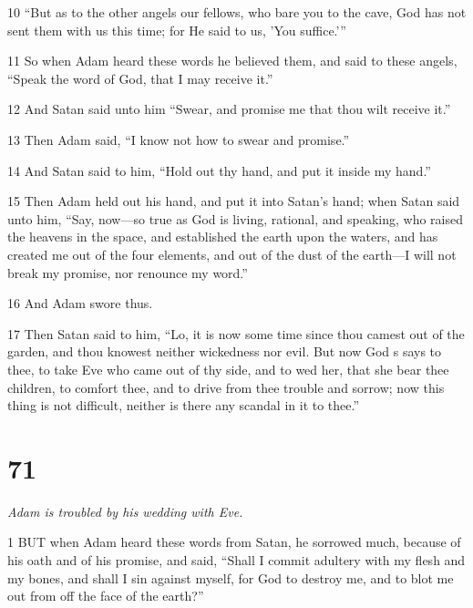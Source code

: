 \par 10 “But as to the other angels our fellows, who bare you to the cave, God has not sent them with us this time; for He said to us, 'You suffice.'”

\par 11 So when Adam heard these words he believed them, and said to these angels, “Speak the word of God, that I may receive it.”

\par 12 And Satan said unto him “Swear, and promise me that thou wilt receive it.”

\par 13 Then Adam said, “I know not how to swear and promise.”

\par 14 And Satan said to him, “Hold out thy hand, and put it inside my hand.”

\par 15 Then Adam held out his hand, and put it into Satan's hand; when Satan said unto him, “Say, now—so true as God is living, rational, and speaking, who raised the heavens in the space, and established the earth upon the waters, and has created me out of the four elements, and out of the dust of the earth—I will not break my promise, nor renounce my word.”

\par 16 And Adam swore thus.

\par 17 Then Satan said to him, “Lo, it is now some time since thou camest out of the garden, and thou knowest neither wickedness nor evil. But now God s says to thee, to take Eve who came out of thy side, and to wed her, that she bear thee children, to comfort thee, and to drive from thee trouble and sorrow; now this thing is not difficult, neither is there any scandal in it to thee.”

\chapter{71}

\par \textit{Adam is troubled by his wedding with Eve.}

\par 1 BUT when Adam heard these words from Satan, he sorrowed much, because of his oath and of his promise, and said, “Shall I commit adultery with my flesh and my bones, and shall I sin against myself, for God to destroy me, and to blot me out from off the face of the earth?”

